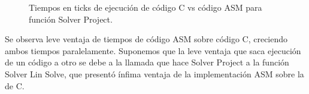 \begin{figure}[htbp]
\centering


\caption{Tiempos en ticks de ejecución de código C vs código ASM para función Solver Project.} \label{fig:lego}
\end{figure}

Se observa leve ventaja de tiempos de código ASM sobre código C, creciendo ambos tiempos paralelamente. 
Suponemos que la leve ventaja que saca ejecución de un código a otro se debe a la llamada que hace Solver Project a la función Solver Lin Solve, que presentó ínfima ventaja de la implementación ASM sobre la de C.


